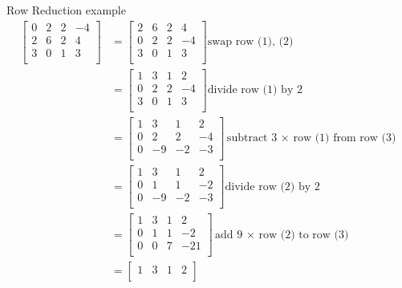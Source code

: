 \documentclass{article}
\theoremstyle{mytheoremstyle}
\theoremstyle{mytheoremstyle}
\theoremstyle{myproblemstyle}
\begin{document}
    Row Reduction example
    \begin{align*}
        \begin{bmatrix}
            0 & 2 & 2 & -4 \\
            2 & 6 & 2 & 4 \\
            3 & 0 & 1 & 3 \\
        \end{bmatrix}
        &=\begin{bmatrix}
            2 & 6 & 2 & 4 \\
            0 & 2 & 2 & -4 \\
            3 & 0 & 1 & 3 \\
        \end{bmatrix} \text{swap row (1), (2)} \\
        &=\begin{bmatrix}
            1 & 3 & 1 & 2 \\
            0 & 2 & 2 & -4 \\
            3 & 0 & 1 & 3 \\
        \end{bmatrix} \text{divide row (1) by 2} \\
        &=\begin{bmatrix}
            1 & 3 & 1 & 2 \\
            0 & 2 & 2 & -4 \\
            0 &-9 &-2 &-3 \\
        \end{bmatrix}  \text{subtract 3 $\times$ row (1) from row (3)}\\
        &=\begin{bmatrix}
            1 & 3 & 1 & 2 \\
            0 & 1 & 1 & -2 \\
            0 &-9 &-2 &-3 \\
        \end{bmatrix} \text{divide row (2) by 2}\\
        &=\begin{bmatrix}
            1 & 3 & 1 & 2 \\
            0 & 1 & 1 & -2 \\
            0 & 0 & 7 & -21 \\
        \end{bmatrix} \text{add 9 $\times$ row (2) to row (3)}\\
        &=\begin{bmatrix}
            1 & 3 & 1 & 2 \\

\end{bmatrix}
\end{align*}
\end{document}
